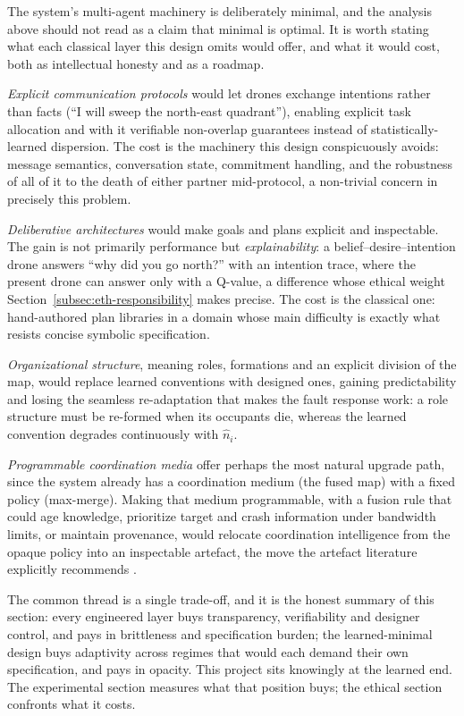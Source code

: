 The system's multi-agent machinery is deliberately minimal, and the analysis
above should not read as a claim that minimal is optimal. It is worth stating
what each classical layer this design omits would offer, and what it would cost,
both as intellectual honesty and as a roadmap.

\emph{Explicit communication protocols} \citep{finin1994kqml} would let drones
exchange intentions rather than facts (``I will sweep the north-east quadrant''),
enabling explicit task allocation and with it verifiable non-overlap guarantees
instead of statistically-learned dispersion. The cost is the machinery this
design conspicuously avoids: message semantics, conversation state, commitment
handling, and the robustness of all of it to the death of either partner
mid-protocol, a non-trivial concern in precisely this problem.

\emph{Deliberative architectures} \citep{rao1995bdi} would make goals and plans
explicit and inspectable. The gain is not primarily performance but
\emph{explainability}: a belief--desire--intention drone answers ``why did you go
north?'' with an intention trace, where the present drone can answer only with a
Q-value, a difference whose ethical weight
Section~\ref{subsec:eth-responsibility} makes precise. The cost is the classical
one: hand-authored plan libraries in a domain whose main difficulty is exactly
what resists concise symbolic specification.

\emph{Organizational structure}, meaning roles, formations and an explicit
division of the map, would replace learned conventions with designed ones,
gaining predictability and losing the seamless re-adaptation that makes the fault
response work: a role structure must be re-formed when its occupants die, whereas
the learned convention degrades continuously with $\hat n_i$.

\emph{Programmable coordination media}
\citep{gelernter1985generative,omicini2001tuple} offer perhaps the most natural
upgrade path, since the system already has a coordination medium (the fused map)
with a fixed policy (max-merge). Making that medium programmable, with a fusion
rule that could age knowledge, prioritize target and crash information under
bandwidth limits, or maintain provenance, would relocate coordination
intelligence from the opaque policy into an inspectable artefact, the move the
artefact literature explicitly recommends \citep{omicini2008artifacts}.

The common thread is a single trade-off, and it is the honest summary of this
section: every engineered layer buys transparency, verifiability and designer
control, and pays in brittleness and specification burden; the learned-minimal
design buys adaptivity across regimes that would each demand their own
specification, and pays in opacity. This project sits knowingly at the learned
end. The experimental section measures what that position buys; the ethical
section confronts what it costs.
